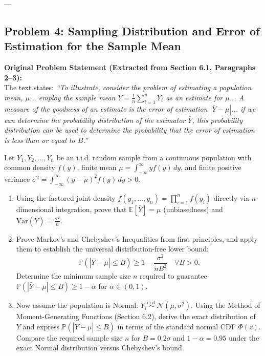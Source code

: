 \documentclass[11pt, letterpaper]{article}
\theoremstyle{definition}
\theoremstyle{remark}
\newcommand{\E}{\mathbb{E}}
\newcommand{\Prob}{\mathbb{P}}
\begin{document}
---

\subsection{Problem 4: Sampling Distribution and Error of Estimation for the Sample Mean}

\textbf{Original Problem Statement (Extracted from Section 6.1, Paragraphs 2--3):} \\ \relax
The text states: \emph{``To illustrate, consider the problem of estimating a population mean, $\mu$... employ the sample mean $\bar{Y} = \frac{1}{n}\sum_{i=1}^n Y_i$ as an estimate for $\mu$... A measure of the goodness of an estimate is the error of estimation $|\bar{Y} - \mu|$... if we can determine the probability distribution of the estimator $\bar{Y}$, this probability distribution can be used to determine the probability that the error of estimation is less than or equal to $B$.''}

Let $Y_1, Y_2, \dots, Y_n$ be an i.i.d. random sample from a continuous population with common density $f(y)$, finite mean $\mu = \int_{-\infty}^{\infty} y f(y)\,dy$, and finite positive variance $\sigma^2 = \int_{-\infty}^{\infty} (y - \mu)^2 f(y)\,dy > 0$.
\begin{enumerate}[label=(\alph*)]
    \item Using the factored joint density $f(y_1, \dots, y_n) = \prod_{i=1}^n f(y_i)$ directly via $n$-dimensional integration, prove that $\E[\bar{Y}] = \mu$ (unbiasedness) and $\text{Var}(\bar{Y}) = \frac{\sigma^2}{n}$.
    \item Prove Markov's and Chebyshev's Inequalities from first principles, and apply them to establish the universal distribution-free lower bound:
    \[
        \Prob\left(|\bar{Y} - \mu| \le B\right) \ge 1 - \frac{\sigma^2}{n B^2} \quad \forall B > 0.
    \]
    Determine the minimum sample size $n$ required to guarantee $\Prob(|\bar{Y} - \mu| \le B) \ge 1 - \alpha$ for $\alpha \in (0, 1)$.
    \item Now assume the population is Normal: $Y_i \stackrel{\text{i.i.d.}}{\sim} \mathcal{N}(\mu, \sigma^2)$. Using the Method of Moment-Generating Functions (Section 6.2), derive the exact distribution of $\bar{Y}$ and express $\Prob(|\bar{Y} - \mu| \le B)$ in terms of the standard normal CDF $\Phi(z)$. Compare the required sample size $n$ for $B = 0.2\sigma$ and $1 - \alpha = 0.95$ under the exact Normal distribution versus Chebyshev's bound.
\end{enumerate}
\end{document}
